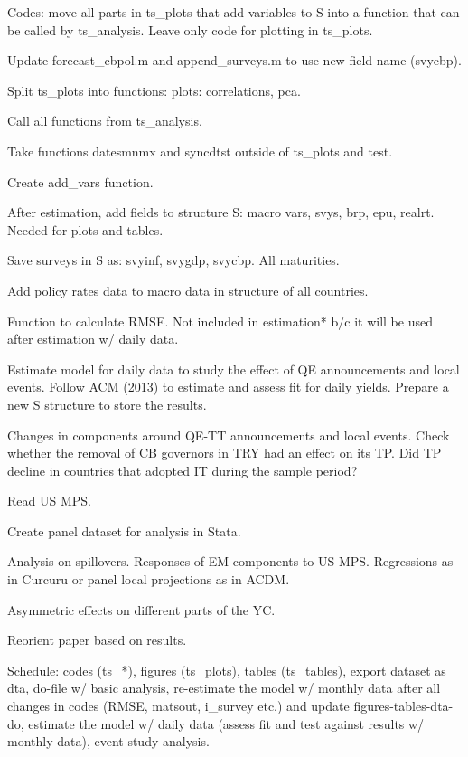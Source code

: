 \documentclass[12pt]{article}
\newcommand{\cmark}{\ding{51}}
\newcommand{\done}{\rlap{$\square$}{\raisebox{2pt}{\large\hspace{1pt}\cmark}}%
	\hspace{-2.5pt}}
\begin{document}
\begin{todolist}
	\item Codes: move all parts in ts_plots that add variables to S into a function that can be called by ts_analysis. Leave only code for plotting in ts_plots.
	\begin{todolist}		
		\item Update forecast_cbpol.m and append_surveys.m to use new field name (svycbp).
		\item[\done] Split ts_plots into functions: plots: correlations, pca.
		\item[\done] Call all functions from ts_analysis.
		\item[\done] Take functions datesmnmx and syncdtst outside of ts_plots and test.
		\item[\done] Create add_vars function.
		\item[\done] After estimation, add fields to structure S: macro vars, svys, brp, epu, realrt. Needed for plots and tables.
		\item[\done] Save surveys in S as: svyinf, svygdp, svycbp. All maturities. 
		\item[\done] Add policy rates data to macro data in structure of all countries.
\end{todolist}
	\item Function to calculate RMSE. Not included in estimation* b/c it will be used after estimation w/ daily data.
	\item Estimate model for daily data to study the effect of QE announcements and local events. Follow ACM (2013) to estimate and assess fit for daily yields. Prepare a new S structure to store the results.
	\item Changes in components around QE-TT announcements and local events. Check whether the removal of CB governors in TRY had an effect on its TP. Did TP decline in countries that adopted IT during the sample period?
	\item Read US MPS.
	\item Create panel dataset for analysis in Stata.
	\item Analysis on spillovers. Responses of EM components to US MPS. Regressions as in Curcuru or panel local projections as in ACDM. 
	\item Asymmetric effects on different parts of the YC.
	\item Reorient paper based on results.
	\item Schedule: codes (ts_*), figures (ts_plots), tables (ts_tables), export dataset as dta, do-file w/ basic analysis, re-estimate the model w/ monthly data after all changes in codes (RMSE, matsout, i_survey etc.) and update figures-tables-dta-do, estimate the model w/ daily data (assess fit and test against results w/ monthly data), event study analysis.
\end{todolist}
\end{document}
